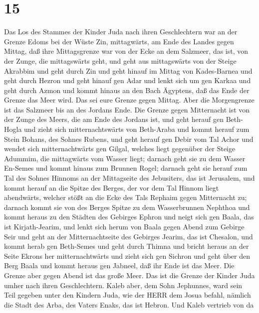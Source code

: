 \hypertarget{section-14}{%
\section{15}\label{section-14}}

 Das Los des Stammes der Kinder Juda nach ihren
Geschlechtern war an der Grenze Edoms bei der Wüste Zin, mittagwärts, am
Ende des Landes gegen Mittag,  daß ihre Mittagsgrenze war
von der Ecke an dem Salzmeer, das ist, von der Zunge, die mittagswärts
geht,  und geht aus mittagswärts von der Steige Akrabbim und
geht durch Zin und geht hinauf im Mittag von Kades-Barnea und geht durch
Hezron und geht hinauf gen Adar und lenkt sich um gen Karkaa
 und geht durch Azmon und kommt hinaus an den Bach Ägyptens,
daß das Ende der Grenze das Meer wird. Das sei eure Grenze gegen Mittag.
 Aber die Morgengrenze ist das Salzmeer bis an des Jordans
Ende. Die Grenze gegen Mitternacht ist von der Zunge des Meers, die am
Ende des Jordans ist,  und geht herauf gen Beth-Hogla und
zieht sich mitternachtswärts von Beth-Araba und kommt herauf zum Stein
Bohans, des Sohnes Rubens,  und geht herauf gen Debir vom
Tal Achor und wendet sich mitternachtwärts gen Gilgal, welches liegt
gegenüber der Steige Adummim, die mittagwärts vom Wasser liegt; darnach
geht sie zu dem Wasser En-Semes und kommt hinaus zum Brunnen Rogel;
 darnach geht sie herauf zum Tal des Sohnes Hinnoms an der
Mittagseite des Jebusiters, das ist Jerusalem, und kommt herauf an die
Spitze des Berges, der vor dem Tal Hinnom liegt abendwärts, welcher
stößt an die Ecke des Tals Rephaim gegen Mitternacht zu; 
darnach kommt sie von des Berges Spitze zu dem Wasserbrunnen Nephthoa
und kommt heraus zu den Städten des Gebirges Ephron und neigt sich gen
Baala, das ist Kirjath-Jearim,  und lenkt sich herum von
Baala gegen Abend zum Gebirge Seir und geht an der Mitternachtseite des
Gebirges Jearim, das ist Chesalon, und kommt herab gen Beth-Semes und
geht durch Thimna  und bricht heraus an der Seite Ekrons
her mitternachtwärts und zieht sich gen Sichron und geht über den Berg
Baala und kommt heraus gen Jabneel, daß ihr Ende ist das Meer.
 Die Grenze aber gegen Abend ist das große Meer. Das ist
die Grenze der Kinder Juda umher nach ihren Geschlechtern. 
Kaleb aber, dem Sohn Jephunnes, ward sein Teil gegeben unter den Kindern
Juda, wie der HERR dem Josua befahl, nämlich die Stadt des Arba, des
Vaters Enaks, das ist Hebron.  Und Kaleb vertrieb von da
